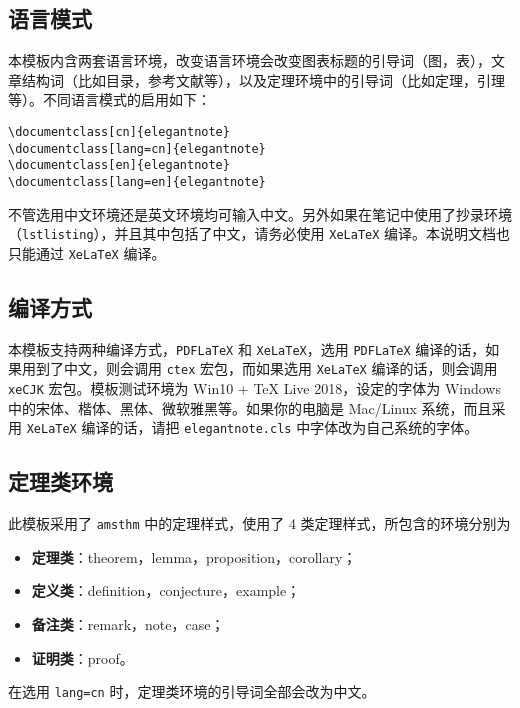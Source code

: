 \documentclass[cn,normal,12pt]{../elegantnote}
\begin{document}
\subsection{语言模式}
本模板内含两套语言环境，改变语言环境会改变图表标题的引导词（图，表），文章结构词（比如目录，参考文献等），以及定理环境中的引导词（比如定理，引理等）。不同语言模式的启用如下：
\begin{lstlisting}[frame=none]  
\documentclass[cn]{elegantnote} 
\documentclass[lang=cn]{elegantnote}
\documentclass[en]{elegantnote} 
\documentclass[lang=en]{elegantnote}
\end{lstlisting}
\begin{note}
不管选用中文环境还是英文环境均可输入中文。另外如果在笔记中使用了抄录环境（\lstinline{lstlisting}），并且其中包括了中文，请务必使用 \lstinline{XeLaTeX} 编译。本说明文档也只能通过 \lstinline{XeLaTeX} 编译。
\end{note}

\subsection{编译方式}

本模板支持两种编译方式，\lstinline{PDFLaTeX} 和 \lstinline{XeLaTeX}，选用 \lstinline{PDFLaTeX} 编译的话，如果用到了中文，则会调用 \lstinline{ctex} 宏包，而如果选用 \lstinline{XeLaTeX} 编译的话，则会调用 \lstinline{xeCJK} 宏包。模板测试环境为 Win10 + \TeX{} Live 2018，设定的字体为 Windows 中的宋体、楷体、黑体、微软雅黑等。如果你的电脑是 Mac/Linux 系统，而且采用 \lstinline{XeLaTeX} 编译的话，请把 \lstinline{elegantnote.cls} 中字体改为自己系统的字体。

\subsection{定理类环境}
此模板采用了 \lstinline{amsthm} 中的定理样式，使用了 4 类定理样式，所包含的环境分别为
\begin{itemize}
\item \textbf{定理类}：theorem，lemma，proposition，corollary；
\item \textbf{定义类}：definition，conjecture，example；
\item \textbf{备注类}：remark，note，case；
\item \textbf{证明类}：proof。
\end{itemize}

\begin{remark}
在选用 \lstinline{lang=cn} 时，定理类环境的引导词全部会改为中文。
\end{remark}
\end{document}

